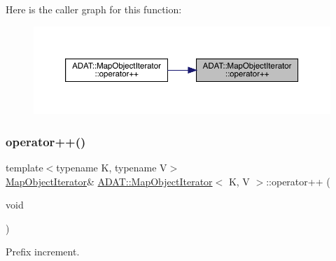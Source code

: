 Here is the caller graph for this function\+:\nopagebreak
\begin{figure}[H]
\begin{center}
\leavevmode
\includegraphics[width=350pt]{d2/d4b/classADAT_1_1MapObjectIterator_a2eedaf3b2fc70d48afd45bd37c5e6e69_icgraph}
\end{center}
\end{figure}
\mbox{\label{classADAT_1_1MapObjectIterator_a2eedaf3b2fc70d48afd45bd37c5e6e69}} 
\subsubsection{\texorpdfstring{operator++()}{operator++()}\hspace{0.1cm}{\footnotesize\ttfamily [2/4]}}
{\footnotesize\ttfamily template$<$typename K, typename V$>$ \\
\mbox{\hyperlink{classADAT_1_1MapObjectIterator}{Map\+Object\+Iterator}}\& \mbox{\hyperlink{classADAT_1_1MapObjectIterator}{A\+D\+A\+T\+::\+Map\+Object\+Iterator}}$<$ K, V $>$\+::operator++ (\begin{DoxyParamCaption}\item[{void}]{ }\end{DoxyParamCaption})\hspace{0.3cm}{\ttfamily [inline]}}



Prefix increment. 

\mbox{\label{classADAT_1_1MapObjectIterator_a90809a5488988dd0d49ce25df35756ae}} 
